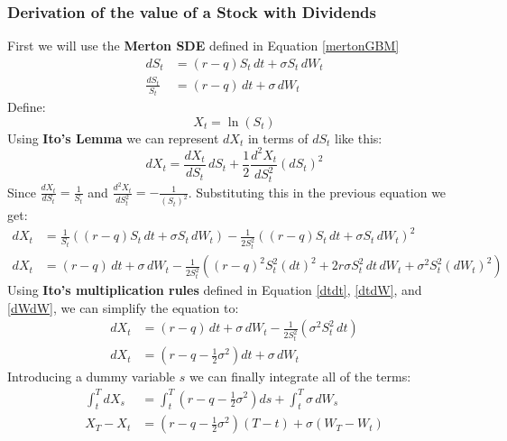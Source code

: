 \documentclass[12pt]{article}
\numberwithin{equation}{section}
\begin{document}
\subsubsection{Derivation of the value of a Stock with Dividends}
First we will use the \textbf{Merton SDE} defined in Equation \ref{mertonGBM}
\begin{equation*} 
	\begin{aligned}
		dS_t &= (r-q)S_t\,dt + \sigma S_t\,dW_t \\
		\frac{dS_t}{S_t} &= (r-q)\,dt + \sigma\,dW_t
	\end{aligned}
	\label{eq:gbm-sde}
\end{equation*}
Define: 
\begin{equation}
	X_t = \ln(S_t)
	\label{eq:log-stock-definition}
\end{equation}
Using \textbf{Ito's Lemma} we can represent $dX_t$ in terms of $dS_t$ like this: 
\begin{equation*}
	dX_t = \frac{d X_t}{d S_t}\,dS_t + \frac{1}{2}\frac{d^2 X_t}{d S_t^2}(dS_t)^2 
\end{equation*}
Since $\frac{d X_t}{d S_t} = \frac{1}{S_t}$ and $\frac{d^2 X_t}{d S_t^2} = -\frac{1}{(S_t)^2}$. Substituting this in the previous equation we get:
\begin{equation}
	\begin{aligned}
		dX_t
		&= \frac{1}{S_t}\left((r-q)S_t\,dt+\sigma S_t\,dW_t\right)
		-\frac{1}{2S_t^2}
		\left((r-q)S_t\,dt+\sigma S_t\,dW_t\right)^2 \\
		dX_t &= (r-q)\,dt+\sigma\,dW_t
		-\frac{1}{2S_t^2}
		\left(
		(r-q)^2S_t^2(dt)^2
		+2r\sigma S_t^2\,dt\,dW_t
		+\sigma^2S_t^2(dW_t)^2
		\right) 
	\end{aligned}
\end{equation}
Using \textbf{Ito's multiplication rules} defined in Equation \ref{dtdt}, \ref{dtdW}, and \ref{dWdW}, we can simplify the equation to: 
\begin{equation}
	\begin{aligned}
		dX_t &= (r-q)\,dt+\sigma\,dW_t
		-\frac{1}{2S_t^2}
		\left(\sigma^2S_t^2\,dt\right) \\
		dX_t &= \left(r-q-\frac{1}{2}\sigma^2\right)dt+\sigma\,dW_t
	\end{aligned}
	\label{eq:ito-log-stock}
\end{equation}
Introducing a dummy variable $s$ we can finally integrate all of the terms:
\begin{equation}
	\begin{aligned}
		\int_t^T dX_s
		&=
		\int_t^T \left(r-q-\frac{1}{2}\sigma^2\right)ds
		+\int_t^T \sigma\,dW_s \\
		X_T-X_t
		&=
		\left(r-q-\frac{1}{2}\sigma^2\right)(T-t)
		+\sigma(W_T-W_t)
	\end{aligned}
	\label{eq:integrated-log-stock}
\end{equation}
\end{document}
